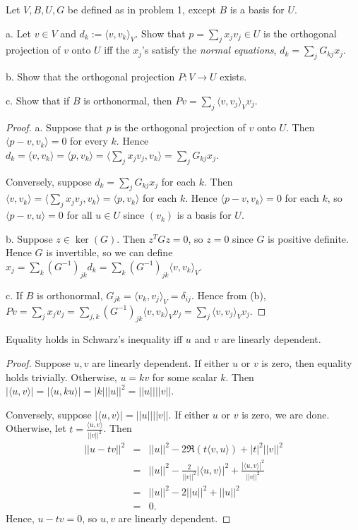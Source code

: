 \documentclass{article}
\begin{document}
 Let $V, B, U, G$ be defined as in problem 1, except $B$ is a basis for $U$.

a. Let $v \in V$ and $d_k := \langle v , v_k \rangle_V$. Show that $p = \sum_j x_j v_j \in U$ is the orthogonal projection of $v$ onto $U$ iff the $x_j$'s satisfy the \emph{normal equations}, $d_k = \sum_j G_{kj} x_j$.

b. Show that the orthogonal projection $P : V \to U$ exists.

c. Show that if $B$ is orthonormal, then $Pv = \sum_j \langle v, v_j \rangle_V v_j$.

\begin{proof}
a. Suppose that $p$ is the orthogonal projection of $v$ onto $U$. Then 
$\langle p - v, v_k \rangle = 0$ for every $k$.  Hence
$d_k = \langle v, v_k \rangle = \langle p, v_k \rangle
= \langle \sum_j x_j v_j, v_k \rangle
= \sum_j G_{kj} x_j$.

Conversely, suppose $d_k = \sum_j G_{kj} x_j$ for each $k$. Then $\langle v, v_k \rangle = \langle \sum_j x_j v_j, v_k \rangle = \langle p, v_k \rangle$ for each $k$.  Hence $\langle p - v, v_k \rangle = 0$ for each $k$, so $\langle p - v, u \rangle = 0$ for all $u \in U$ since $(v_k)$ is a basis for $U$.

b.  Suppose $z \in \ker(G)$.  Then $z^T G z = 0$, so $z = 0$ since $G$ is positive definite.  Hence $G$ is invertible, so we can define $x_j = \sum_k (G^{-1})_{jk} d_k = \sum_k (G^{-1})_{jk} \langle v, v_k \rangle_V$.

c. If $B$ is orthonormal, $G_{jk} = \langle v_k, v_j \rangle_V = \delta_{ij}$. Hence from (b), $Pv = \sum_j x_j v_j = \sum_{j,k} (G^{-1})_{jk} \langle v, v_k \rangle_V v_j = 
\sum_j \langle v, v_j \rangle_V v_j$.

\end{proof}


 Equality holds in Schwarz's inequality iff $u$ and $v$ are linearly dependent.
\begin{proof}
Suppose $u,v$ are linearly dependent. If either $u$ or $v$ is zero, then equality holds trivially.  Otherwise, $u = k v$ for some scalar $k$.  Then $|\langle u, v \rangle | = |\langle u, ku \rangle |  = |k| ||u||^2 = ||u|| ||v||$.

Conversely, suppose $|\langle u, v \rangle | = ||u|| ||v||$. If either $u$ or $v$ is zero, we are done. Otherwise, let $ t = \frac {\langle u, v \rangle} {||v||^2}$. Then 
\begin{align*}
||u - tv||^2 & = &
 ||u||^2 - 2 \Re(t\langle v, u \rangle) + |t|^2 ||v||^2
\\ &= & ||u||^2 - \frac 2 {||v||^2} |\langle u, v \rangle|^2 + \frac {|\langle u , v \rangle|^2} {||v||^2}
\\ &= & ||u||^2 - 2 ||u||^2 + ||u||^2
\\ &= & 0.
\end{align*} 
Hence, $u - tv = 0$, so $u,v$ are linearly dependent.
\end{proof}
\end{document}
